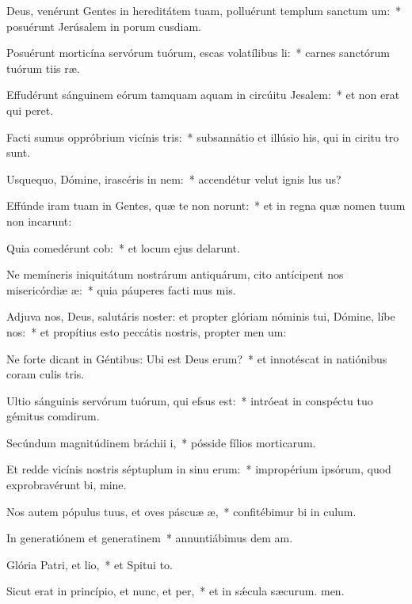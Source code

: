 \item Deus, venérunt Gentes in hereditátem tuam, polluérunt templum sanctum um:~* posuérunt Jerúsalem in porum cusdiam.
\item Posuérunt morticína servórum tuórum, escas volatílibus li:~* carnes sanctórum tuórum tiis ræ.
\item Effudérunt sánguinem eórum tamquam aquam in circúitu Jesalem:~* et non erat qui peret.
\item Facti sumus oppróbrium vicínis tris:~* subsannátio et illúsio his, qui in ciritu tro sunt.
\item Usquequo, Dómine, irascéris in nem:~* accendétur velut ignis lus us?
\item Effúnde iram tuam in Gentes, quæ te non norunt:~* et in regna quæ nomen tuum non incarunt:
\item Quia comedérunt cob:~* et locum ejus delarunt.
\item Ne memíneris iniquitátum nostrárum antiquárum, cito antícipent nos misericórdiæ æ:~* quia páuperes facti mus mis.
\item Adjuva nos, Deus, salutáris noster: et propter glóriam nóminis tui, Dómine, líbe nos:~* et propítius esto peccátis nostris, propter men um:
\item Ne forte dicant in Géntibus: Ubi est Deus erum?~* et innotéscat in natiónibus coram culis tris.
\item Ultio sánguinis servórum tuórum, qui efsus est:~* intróeat in conspéctu tuo gémitus comdirum.
\item Secúndum magnitúdinem bráchii i,~* pósside fílios morticarum.
\item Et redde vicínis nostris séptuplum in sinu erum:~* impropérium ipsórum, quod exprobravérunt bi, mine.
\item Nos autem pópulus tuus, et oves páscuæ æ,~* confitébimur bi in culum.
\item In generatiónem et generatinem~* annuntiábimus dem am.
\item Glória Patri, et lio,~* et Spitui to.
\item Sicut erat in princípio, et nunc, et per,~* et in sǽcula sæcurum. men.

